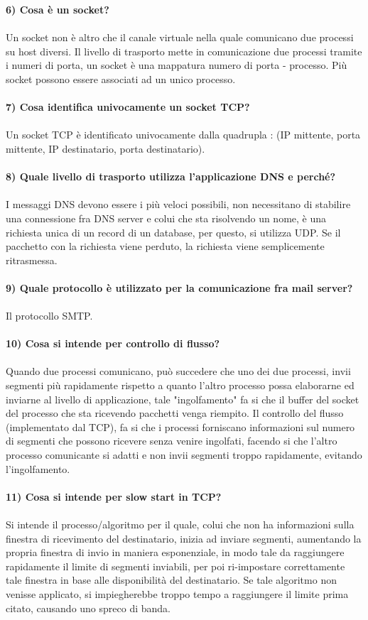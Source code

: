 \documentclass[12pt, letterpaper]{article}
\newcommand{\acc}{\\\hphantom{}\\}
\begin{document}
\textbf{6) Cosa è un socket? }\acc 
Un socket non è altro che il canale virtuale nella quale comunicano due processi su host diversi. Il livello di trasporto mette in 
comunicazione due processi tramite i numeri di porta, un socket è una mappatura numero di porta - processo. Più socket possono 
essere associati ad un unico processo.\acc 


\textbf{7) Cosa identifica univocamente un socket TCP?}\acc 
Un socket TCP è identificato univocamente dalla quadrupla : (IP mittente, porta mittente, IP destinatario, porta destinatario).\acc 


\textbf{8) Quale livello di trasporto utilizza l'applicazione DNS e perché?}\acc
I messaggi DNS devono essere i più veloci possibili, non necessitano di stabilire una connessione fra DNS server e colui che sta risolvendo 
un nome, è una richiesta unica di un record di un database, per questo, si utilizza UDP. Se il pacchetto con la richiesta viene perduto, 
la richiesta viene semplicemente ritrasmessa.\acc 

\textbf{9) Quale protocollo è utilizzato per la comunicazione fra mail server?}\acc 
Il protocollo SMTP.\acc 


\textbf{10) Cosa si intende per controllo di flusso?}\acc 
Quando due processi comunicano, può succedere che uno dei due processi, invii segmenti più rapidamente rispetto a quanto l'altro 
processo possa elaborarne ed inviarne al livello di applicazione, tale "ingolfamento" fa si che il buffer del socket del processo che 
sta ricevendo pacchetti venga riempito. Il controllo del flusso (implementato dal TCP), fa si che i processi forniscano informazioni 
sul numero di segmenti che possono ricevere senza venire ingolfati, facendo si che l'altro processo comunicante si adatti e non 
invii segmenti troppo rapidamente, evitando l'ingolfamento.\acc 


\textbf{11) Cosa si intende per slow start in TCP?}\acc 
Si intende il processo/algoritmo per il quale, colui che non ha informazioni sulla finestra di ricevimento del destinatario, 
inizia ad inviare segmenti, aumentando la propria finestra di invio in maniera esponenziale, in modo tale da raggiungere 
rapidamente il limite di segmenti inviabili, per poi ri-impostare correttamente tale finestra in base alle disponibilità del 
destinatario. Se tale algoritmo non venisse applicato, si impiegherebbe troppo tempo a raggiungere il limite prima citato, 
causando uno spreco di banda.\acc 
\end{document}
